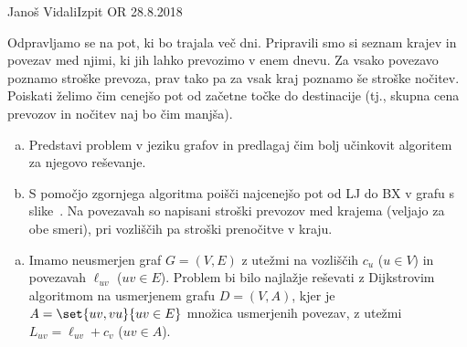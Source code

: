 \begin{naloga}{Janoš Vidali}{Izpit OR 28.8.2018}
\begin{vprasanje}
Odpravljamo se na pot, ki bo trajala več dni.
Pripravili smo si seznam krajev in povezav med njimi,
ki jih lahko prevozimo v enem dnevu.
Za vsako povezavo poznamo stroške prevoza,
prav tako pa za vsak kraj poznamo še stroške nočitev.
Poiskati želimo čim cenejšo pot od začetne točke do destinacije
(tj., skupna cena prevozov in nočitev naj bo čim manjša).

\begin{enumerate}[(a)]
\item Predstavi problem v jeziku grafov
in predlagaj čim bolj učinkovit algoritem za njegovo reševanje.

\item S pomočjo zgornjega algoritma poišči najcenejšo pot od LJ do BX
v grafu s slike~\fig[pocitnice].
Na povezavah so napisani stroški prevozov med krajema
(veljajo za obe smeri),
pri vozliščih pa stroški prenočitve v kraju.
\end{enumerate}
\end{vprasanje}




\begin{odgovor}
\begin{enumerate}[(a)]
\item Imamo neusmerjen graf $G = (V, E)$
z utežmi na vozliščih $c_u$ ($u \in V$) in povezavah $\ell_{uv}$ ($uv \in E$).
Problem bi bilo najlažje reševati z Dijkstrovim algoritmom
na usmerjenem grafu $D = (V, A)$,
kjer je $A = \set{uv, vu}{uv \in E}$ množica usme\-rje\-nih povezav,
z utežmi $L_{uv} = \ell_{uv} + c_v$ ($uv \in A$).


\end{enumerate}
\end{odgovor}
\end{naloga}
